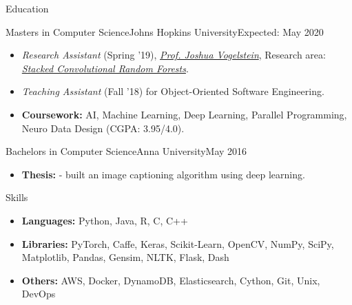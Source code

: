 \documentclass[]{mcdowellcv}
\begin{document}
	\makeheader


\begin{cvsection}{Education}
		\begin{cvsubsection}{Masters in Computer Science}{Johns Hopkins University}{Expected: May 2020}
			\begin{itemize}
				\item \textit{Research Assistant} (Spring '19), \href{https://jovo.me/}{\color{blue!70}\textit{Prof. Joshua Vogelstein}}, Research area: \href{https://github.com/tpsatish95/deep-conv-rf}{\color{blue!70}\textit{Stacked Convolutional Random Forests}}.
				\item \textit{Teaching Assistant} (Fall '18) for Object-Oriented Software Engineering.
				\item \textbf{Coursework:} AI, Machine Learning, Deep Learning, Parallel Programming, Neuro Data Design (CGPA: 3.95/4.0).
			\end{itemize}
		\end{cvsubsection}
		\begin{cvsubsection}{Bachelors in Computer Science}{Anna University}{May 2016}
			\begin{itemize}
				\item \textbf{Thesis:} \href{https://github.com/tpsatish95/image-captioning}{} - built an image captioning algorithm using deep learning.
			\end{itemize}
		\end{cvsubsection}
	\end{cvsection}

    \begin{cvsection}{Skills}
		\begin{cvsubsection}{}{}{}
			\begin{itemize}
				\item \textbf{Languages:} Python, Java, R, C, C++ %
				\item \textbf{Libraries:} PyTorch, Caffe, Keras, Scikit-Learn, OpenCV, NumPy, SciPy, Matplotlib, Pandas, Gensim, NLTK, Flask, Dash
				\item \textbf{Others:} AWS, Docker, DynamoDB, Elasticsearch, Cython, Git, Unix, DevOps
			\end{itemize}
		\end{cvsubsection}
	\end{cvsection}
\end{document}
